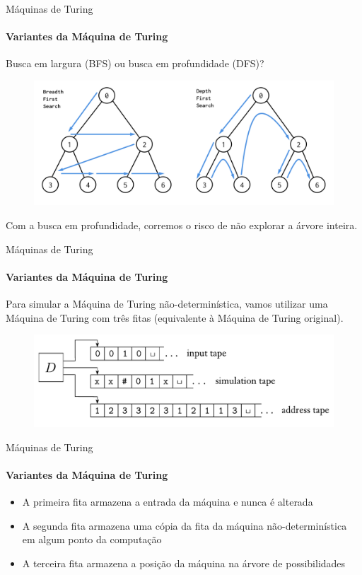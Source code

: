 \documentclass{beamer}
\begin{document}
\begin{frame}{Máquinas de Turing}
	\framesubtitle{Variantes da Máquina de Turing}
	Busca em largura (BFS) ou busca em profundidade (DFS)?
	\begin{figure}
		\includegraphics[width=0.8\paperwidth]{resources/bfs-dfs}
	\end{figure}\pause
	Com a busca em profundidade, corremos o risco de não explorar a árvore inteira.
\end{frame}
\begin{frame}{Máquinas de Turing}
	\framesubtitle{Variantes da Máquina de Turing}
	Para simular a Máquina de Turing não-determinística, vamos utilizar uma Máquina de Turing com três fitas (equivalente à Máquina de Turing original).
	\begin{figure}
		\includegraphics[width=0.8\paperwidth]{resources/multitape-nondet}
	\end{figure}
\end{frame}
\begin{frame}{Máquinas de Turing}
	\framesubtitle{Variantes da Máquina de Turing}
	\begin{itemize}
		\item A primeira fita armazena a entrada da máquina e nunca é alterada
		\item A segunda fita armazena uma cópia da fita da máquina não-determinística em algum ponto da computação
		\item A terceira fita armazena a posição da máquina na árvore de possibilidades
	\end{itemize}
\end{frame}
\end{document}
